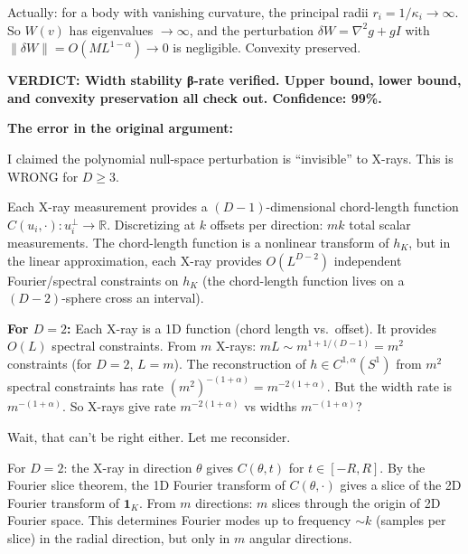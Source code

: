 Actually: for a body with vanishing curvature, the principal radii $r_i = 1/\kappa_i \to \infty$. So $W(v)$ has eigenvalues $\to \infty$, and the perturbation $\delta W = \nabla^2 g + g I$ with $\|\delta W\| = O(ML^{1-\alpha}) \to 0$ is negligible. Convexity preserved. \checkmark

\textbf{VERDICT: Width stability β-rate verified. Upper bound, lower bound, and convexity preservation all check out. Confidence: 99\%.}



\textbf{The error in the original argument:}

I claimed the polynomial null-space perturbation is ``invisible'' to X-rays. This is WRONG for $D \geq 3$.

Each X-ray measurement provides a $(D-1)$-dimensional chord-length function $C(u_i, \cdot) : u_i^\perp \to \mathbb{R}$. Discretizing at $k$ offsets per direction: $mk$ total scalar measurements. The chord-length function is a nonlinear transform of $h_K$, but in the linear approximation, each X-ray provides $O(L^{D-2})$ independent Fourier/spectral constraints on $h_K$ (the chord-length function lives on a $(D-2)$-sphere cross an interval).

\textbf{For $D = 2$:} Each X-ray is a 1D function (chord length vs.\ offset). It provides $O(L)$ spectral constraints. From $m$ X-rays: $mL \sim m^{1 + 1/(D-1)} = m^2$ constraints (for $D=2$, $L = m$). The reconstruction of $h \in C^{1,\alpha}(S^1)$ from $m^2$ spectral constraints has rate $(m^2)^{-(1+\alpha)} = m^{-2(1+\alpha)}$. But the width rate is $m^{-(1+\alpha)}$. So X-rays give rate $m^{-2(1+\alpha)}$ vs widths $m^{-(1+\alpha)}$?

Wait, that can't be right either. Let me reconsider.

For $D = 2$: the X-ray in direction $\theta$ gives $C(\theta, t)$ for $t \in [-R, R]$. By the Fourier slice theorem, the 1D Fourier transform of $C(\theta, \cdot)$ gives a slice of the 2D Fourier transform of $\mathbf{1}_K$. From $m$ directions: $m$ slices through the origin of 2D Fourier space. This determines Fourier modes up to frequency $\sim k$ (samples per slice) in the radial direction, but only in $m$ angular directions.

